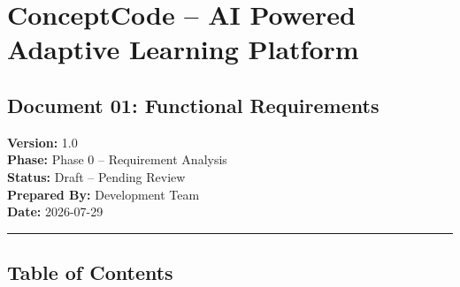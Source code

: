 \documentclass[
]{article}
\author{}
\date{\vspace{-2.5em}}
\begin{document}
\section{ConceptCode -- AI Powered Adaptive Learning
Platform}\label{conceptcode-ai-powered-adaptive-learning-platform}

\subsection{Document 01: Functional
Requirements}\label{document-01-functional-requirements}

\textbf{Version:} 1.0\\
\textbf{Phase:} Phase 0 -- Requirement Analysis\\
\textbf{Status:} Draft -- Pending Review\\
\textbf{Prepared By:} Development Team\\
\textbf{Date:} 2026-07-29

\begin{center}\rule{0.5\linewidth}{0.5pt}\end{center}

\subsection{Table of Contents}\label{table-of-contents}
\end{document}
